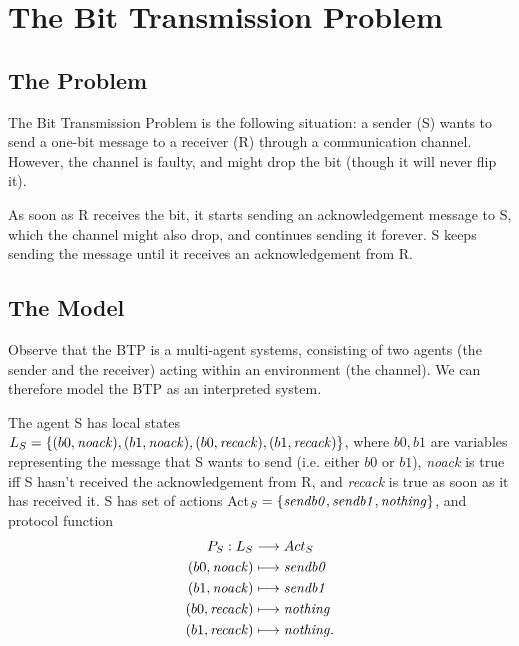 \documentclass[11pt]{report}
\begin{document}
\appendix

\chapter{The Bit Transmission Problem}
\label{BTP}
{\centering
{} }


\section{The Problem}

The Bit Transmission Problem is the following situation: a sender (S) wants to send a one-bit message to a receiver (R) through a communication channel. However, the channel is faulty, and might drop the bit (though it will never flip it). 

As soon as R receives the bit, it starts sending an acknowledgement message to S, which the channel might also drop, and continues sending it forever. S keeps sending the message until it receives an acknowledgement from R.

\section{The Model}

Observe that the BTP is a multi-agent systems, consisting of two agents (the sender and the receiver) acting within an environment (the channel).
We can therefore model the BTP as an interpreted system. 


The agent S has local states $L_S = \{(b0, \mbox{\textit{noack}}), (b1, \mbox{\textit{noack}}), (b0, \mbox{\textit{recack}}), (b1, \mbox{\textit{recack}})\}$, where $b0, b1$ are variables representing the message that S wants to send (i.e. either $b0$ or $b1$), \textit{noack} is true iff S hasn't received the acknowledgement from R, and \textit{recack} is true as soon as it has received it. S has set of actions Act$_S = \{\mbox{\textit{sendb0}}, \mbox{\textit{sendb1}}, \mbox{\textit{nothing}}\}$, and protocol function 
\begin{align*}
P_S: L_S &\longrightarrow Act_S \\
	 (b0, \mbox{\textit{noack}}) &\longmapsto \mbox{\textit{sendb0}} \\
	 (b1, \mbox{\textit{noack}}) &\longmapsto \mbox{\textit{sendb1}} \\
	 (b0, \mbox{\textit{recack}}) &\longmapsto \mbox{\textit{nothing}} \\
	 (b1, \mbox{\textit{recack}}) &\longmapsto \mbox{\textit{nothing}}.
\end{align*}
\end{document}
